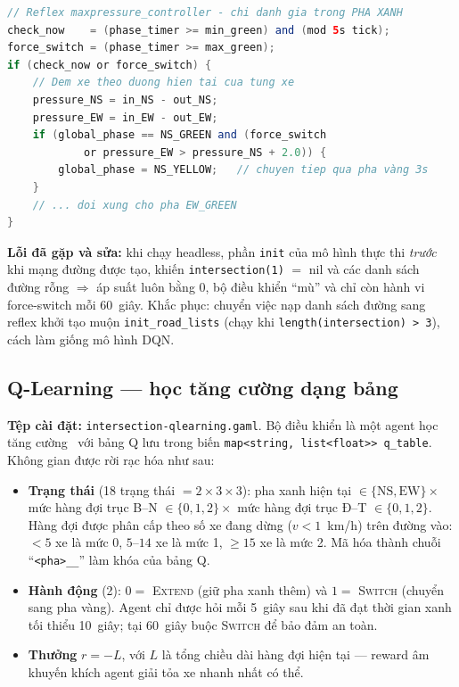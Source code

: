 \documentclass[11pt,a4paper]{article}
\begin{document}
\begin{lstlisting}[language=Java]
// Reflex maxpressure_controller - chi danh gia trong PHA XANH
check_now    = (phase_timer >= min_green) and (mod 5s tick);
force_switch = (phase_timer >= max_green);
if (check_now or force_switch) {
    // Dem xe theo duong hien tai cua tung xe
    pressure_NS = in_NS - out_NS;
    pressure_EW = in_EW - out_EW;
    if (global_phase == NS_GREEN and (force_switch
            or pressure_EW > pressure_NS + 2.0)) {
        global_phase = NS_YELLOW;   // chuyen tiep qua pha vàng 3s
    }
    // ... doi xung cho pha EW_GREEN
}
\end{lstlisting}

\textbf{Lỗi đã gặp và sửa:} khi chạy headless, phần \texttt{init} của mô hình thực
thi \emph{trước} khi mạng đường được tạo, khiến \texttt{intersection(1)} $=$ nil và
các danh sách đường rỗng $\Rightarrow$ áp suất luôn bằng 0, bộ điều khiển ``mù'' và
chỉ còn hành vi force-switch mỗi 60~giây. Khắc phục: chuyển việc nạp danh sách đường
sang reflex khởi tạo muộn \texttt{init\_road\_lists} (chạy khi
\texttt{length(intersection) > 3}), cách làm giống mô hình DQN.

\subsection{Q-Learning --- học tăng cường dạng bảng}

\textbf{Tệp cài đặt:} \texttt{intersection-qlearning.gaml}. Bộ điều khiển là một
agent học tăng cường~\cite{watkins1992} với bảng Q lưu trong biến
\texttt{map<string, list<float>> q\_table}. Không gian được rời rạc hóa như sau:

\begin{itemize}[leftmargin=*]
    \item \textbf{Trạng thái} (18 trạng thái $= 2 \times 3 \times 3$): pha xanh
    hiện tại $\in \{\text{NS}, \text{EW}\} \times$ mức hàng đợi trục B--N
    $\in \{0,1,2\} \times$ mức hàng đợi trục Đ--T $\in \{0,1,2\}$. Hàng đợi được
    phân cấp theo số xe đang dừng ($v < 1$~km/h) trên đường vào: $<5$ xe là mức 0,
    $5$--$14$ xe là mức 1, $\ge 15$ xe là mức 2. Mã hóa thành chuỗi
    ``\texttt{<pha>\_<muc NS>\_<muc EW>}'' làm khóa của bảng Q.
    \item \textbf{Hành động} (2): $0 = $ \textsc{Extend} (giữ pha xanh thêm) và
    $1 = $ \textsc{Switch} (chuyển sang pha vàng). Agent chỉ được hỏi mỗi 5~giây
    sau khi đã đạt thời gian xanh tối thiểu 10~giây; tại 60~giây buộc
    \textsc{Switch} để bảo đảm an toàn.
    \item \textbf{Thưởng} $r = -L$, với $L$ là tổng chiều dài hàng đợi hiện tại ---
    reward âm khuyến khích agent giải tỏa xe nhanh nhất có thể.
\end{itemize}
\end{document}
